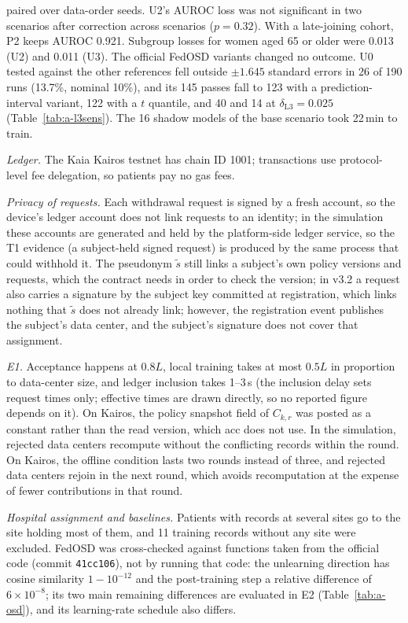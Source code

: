 paired over data-order seeds. U2's AUROC loss was not significant in two scenarios after correction across scenarios ($p=0.32$). With a late-joining cohort, P2 keeps AUROC 0.921. Subgroup losses for women aged 65 or older were 0.013 (U2) and 0.011 (U3). The official FedOSD variants changed no \Lthree{} outcome. U0 tested against the other references fell outside $\pm1.645$ standard errors in 26 of 190 runs (13.7\%, nominal 10\%), and its 145 passes fall to 123 with a prediction-interval variant, 122 with a $t$ quantile, and 40 and 14 at $\delta_{\mathrm{L3}}=0.025$ (Table~\ref{tab:a-l3sens}). The 16 shadow models of the base scenario took 22\,min to train.

\emph{Ledger.} The Kaia Kairos testnet has chain ID 1001; transactions use protocol-level fee delegation, so patients pay no gas fees.

\emph{Privacy of requests.} Each withdrawal request is signed by a fresh account, so the device's ledger account does not link requests to an identity; in the simulation these accounts are generated and held by the platform-side ledger service, so the T1 evidence (a subject-held signed request) is produced by the same process that could withhold it. The pseudonym $\tilde{s}$ still links a subject's own policy versions and requests, which the contract needs in order to check the version; in v3.2 a request also carries a signature by the subject key committed at registration, which links nothing that $\tilde{s}$ does not already link; however, the registration event publishes the subject's data center, and the subject's signature does not cover that assignment.

\emph{E1.} Acceptance happens at $0.8L$, local training takes at most $0.5L$ in proportion to data-center size, and ledger inclusion takes 1--3\,s (the inclusion delay sets request times only; effective times are drawn directly, so no reported figure depends on it). On Kairos, the policy snapshot field of $C_{k,r}$ was posted as a constant rather than the read version, which acc does not use. In the simulation, rejected data centers recompute without the conflicting records within the round. On Kairos, the offline condition lasts two rounds instead of three, and rejected data centers rejoin in the next round, which avoids recomputation at the expense of fewer contributions in that round.

\emph{Hospital assignment and baselines.} Patients with records at several sites go to the site holding most of them, and 11 training records without any site were excluded. FedOSD was cross-checked against functions taken from the official code (commit \texttt{41cc106}), not by running that code: the unlearning direction has cosine similarity $1-10^{-12}$ and the post-training step a relative difference of $6\times10^{-8}$; its two main remaining differences are evaluated in E2 (Table~\ref{tab:a-osd}), and its learning-rate schedule also differs.

